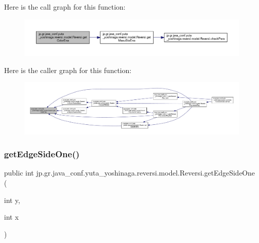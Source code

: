 Here is the call graph for this function\+:\nopagebreak
\begin{figure}[H]
\begin{center}
\leavevmode
\includegraphics[width=350pt]{classjp_1_1gr_1_1java__conf_1_1yuta__yoshinaga_1_1reversi_1_1model_1_1_reversi_ac6fafa41eeff56abfc67b2b5876b50f9_cgraph}
\end{center}
\end{figure}
Here is the caller graph for this function\+:\nopagebreak
\begin{figure}[H]
\begin{center}
\leavevmode
\includegraphics[width=350pt]{classjp_1_1gr_1_1java__conf_1_1yuta__yoshinaga_1_1reversi_1_1model_1_1_reversi_ac6fafa41eeff56abfc67b2b5876b50f9_icgraph}
\end{center}
\end{figure}
\mbox{\label{classjp_1_1gr_1_1java__conf_1_1yuta__yoshinaga_1_1reversi_1_1model_1_1_reversi_aa3c701584a82e4656cb1c60123454953}} 
\subsubsection{\texorpdfstring{get\+Edge\+Side\+One()}{getEdgeSideOne()}}
{\footnotesize\ttfamily public int jp.\+gr.\+java\+\_\+conf.\+yuta\+\_\+yoshinaga.\+reversi.\+model.\+Reversi.\+get\+Edge\+Side\+One (\begin{DoxyParamCaption}\item[{int}]{y,  }\item[{int}]{x }\end{DoxyParamCaption})}



